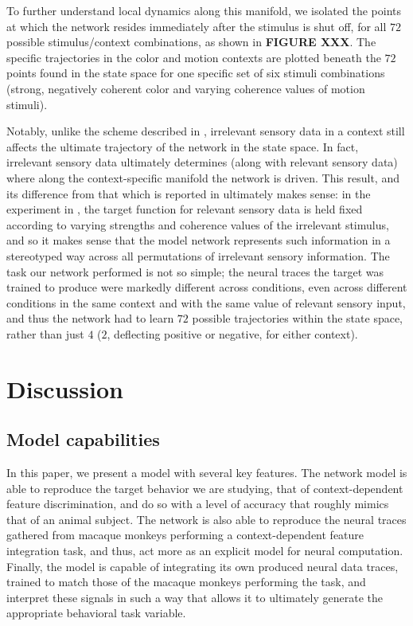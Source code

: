 \documentclass[12pt,a4paper,final]{iopart}
\begin{document}
To further understand local dynamics along this manifold, we isolated the points at which the network resides immediately after the stimulus is shut off, for all $72$ possible stimulus/context combinations, as shown in \textbf{FIGURE XXX}. The specific trajectories in the color and motion contexts are plotted beneath the $72$ points found in the state space for one specific set of six stimuli combinations (strong, negatively coherent color and varying coherence values of motion stimuli).

Notably, unlike the scheme described in \cite{Mante2013}, irrelevant sensory data in a context still affects the ultimate trajectory of the network in the state space. In fact, irrelevant sensory data ultimately determines (along with relevant sensory data) where along the context-specific manifold the network is driven. This result, and its difference from that which is reported in \cite{Mante2013} ultimately makes sense: in the experiment in \cite{Mante2013}, the target function for relevant sensory data is held fixed according to varying strengths and coherence values of the irrelevant stimulus, and so it makes sense that the model network represents such information in a stereotyped way across all permutations of irrelevant sensory information. The task our network performed is not so simple; the neural traces the target was trained to produce were markedly different across conditions, even across different conditions in the same context and with the same value of relevant sensory input, and thus the network had to learn $72$ possible trajectories within the state space, rather than just $4$ ($2$, deflecting positive or negative, for either context).

\section{Discussion}
\label{sec:dis}
\subsection{Model capabilities}
In this paper, we present a model with several key features. The network model is able to reproduce the target behavior we are studying, that of context-dependent feature discrimination, and do so with a level of accuracy that roughly mimics that of an animal subject. The network is also able to reproduce the neural traces gathered from macaque monkeys performing a context-dependent feature integration task, and thus, act more as an explicit model for neural computation. Finally, the model is capable of integrating its own produced neural data traces, trained to match those of the macaque monkeys performing the task, and interpret these signals in such a way that allows it to ultimately generate the appropriate behavioral task variable. 
\end{document}
